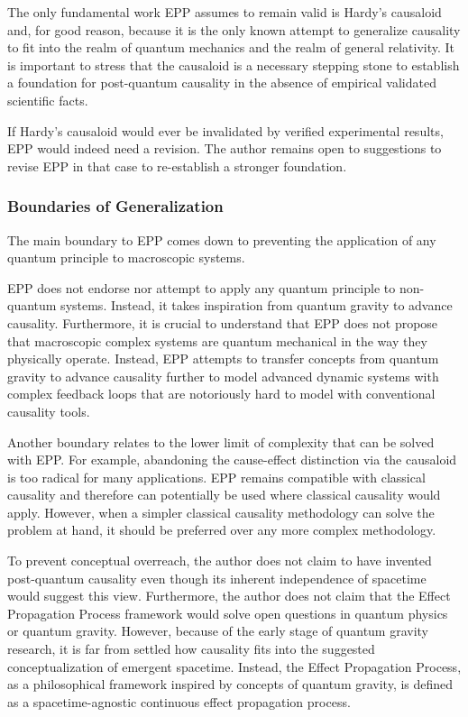 \documentclass{article}
\begin{document}
The only fundamental work EPP assumes to remain valid is Hardy’s causaloid and, for good reason, because it is the only known attempt to generalize causality to fit into the realm of quantum mechanics and the realm of general relativity. It is important to stress that the causaloid is a necessary stepping stone to establish a foundation for post-quantum causality in the absence of empirical validated scientific facts.

If Hardy’s causaloid would ever be invalidated by verified experimental results, EPP would indeed need a revision. The author remains open to suggestions to revise EPP in that case to re-establish a stronger foundation.

\newpage

\subsubsection{Boundaries of Generalization}

The main boundary to EPP comes down to preventing the application of any quantum principle to macroscopic systems.

EPP does not endorse nor attempt to apply any quantum principle to non-quantum systems. Instead, it takes inspiration from quantum gravity to advance causality. Furthermore, it is crucial to understand that EPP does not propose that macroscopic complex systems are quantum mechanical in the way they physically operate. Instead, EPP attempts to transfer concepts from quantum gravity to advance causality further to model advanced dynamic systems with complex feedback loops that are notoriously hard to model with conventional causality tools.

Another boundary relates to the lower limit of complexity that can be solved with EPP. For example, abandoning the cause-effect distinction via the causaloid is too radical for many applications. EPP remains compatible with classical causality and therefore can potentially be used where classical causality would apply. However, when a simpler classical causality methodology can solve the problem at hand, it should be preferred over any more complex methodology.

To prevent conceptual overreach, the author does not claim to have invented post-quantum causality even though its inherent independence of spacetime would suggest this view. Furthermore, the author does not claim that the Effect Propagation Process framework would solve open questions in quantum physics or quantum gravity. However, because of the early stage of quantum gravity research, it is far from settled how causality fits into the suggested conceptualization of emergent spacetime. Instead, the Effect Propagation Process, as a philosophical framework inspired by concepts of quantum gravity, is defined as a spacetime-agnostic continuous effect propagation process.
\end{document}
